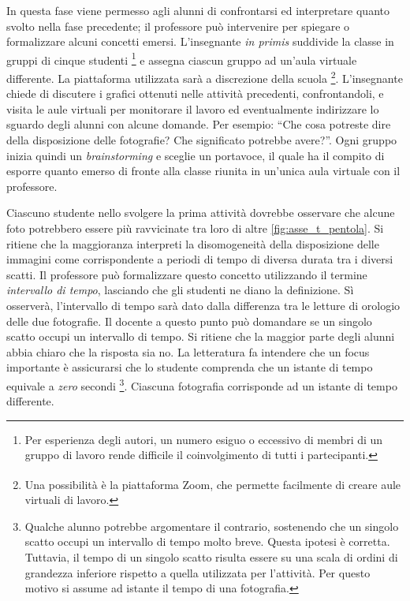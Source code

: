\documentclass{report} \usepackage[T1]{fontenc} \usepackage[italian]{babel}
\begin{document}
In questa fase viene permesso agli alunni di confrontarsi ed interpretare
quanto svolto nella fase precedente; il professore può intervenire per spiegare
o formalizzare alcuni concetti emersi.
L’insegnante \emph{in primis} suddivide la classe in gruppi di cinque studenti
\footnote{
          Per  esperienza degli autori, un numero esiguo o eccessivo di membri
          di un gruppo di lavoro rende difficile il coinvolgimento di tutti i
          partecipanti.
         }
e assegna
ciascun gruppo ad un’aula virtuale differente. La piattaforma utilizzata sarà a
discrezione della scuola
\footnote{
          Una possibilità è la piattaforma Zoom\textsuperscript{\textregistered},
          che  permette facilmente di creare aule virtuali di lavoro.
         }.
L’insegnante chiede di
discutere i grafici ottenuti nelle attività precedenti, confrontandoli, e
visita le aule virtuali per monitorare il lavoro ed eventualmente indirizzare
lo sguardo degli alunni con alcune domande. Per esempio: ``Che cosa potreste
dire della disposizione delle fotografie? Che significato potrebbe avere?''.
Ogni gruppo inizia quindi un \emph{brainstorming} e sceglie un portavoce,
il quale ha il  compito di esporre quanto emerso di fronte alla classe riunita
in un’unica aula virtuale con il professore.

Ciascuno studente nello svolgere la prima attività dovrebbe osservare che
alcune foto potrebbero essere più ravvicinate tra loro di altre
\ref{fig:asse_t_pentola}. Si ritiene che la maggioranza
interpreti la disomogeneità della disposizione delle
immagini come corrispondente a periodi di tempo di diversa durata tra i diversi
scatti. Il professore può formalizzare questo concetto utilizzando il termine
\emph{intervallo di tempo}, lasciando che gli studenti ne diano la definizione.
Sì osserverà, l’intervallo di tempo sarà dato dalla differenza tra le
letture di orologio delle due fotografie. Il docente a questo punto può
domandare se un singolo scatto occupi un intervallo di tempo. Si ritiene che la
maggior parte degli alunni abbia chiaro che la risposta sia no. La letteratura
fa intendere che un focus importante è assicurarsi che lo studente comprenda
che un istante di tempo equivale a \emph{zero} secondi\cite{arons1997teaching}
\footnote{
          Qualche alunno potrebbe argomentare il contrario, sostenendo che un singolo scatto
          occupi un intervallo di tempo molto breve. Questa ipotesi è corretta. Tuttavia,
          il tempo di un singolo scatto risulta essere su una scala di ordini di
          grandezza inferiore rispetto a quella utilizzata per l’attività. Per questo
          motivo si assume ad istante il tempo di una fotografia.
         }.
Ciascuna fotografia corrisponde ad un istante di tempo differente.
\end{document}
